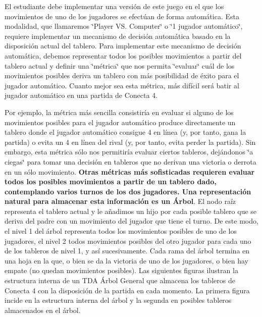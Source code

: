El estudiante debe implementar una versión de este juego en el que los movimientos de uno de los jugadores se efectúan de forma automática. Esta modalidad, que llamaremos \char`\"{}\+Player V\+S. Computer\char`\"{} o \char`\"{}1 jugador automático\char`\"{}, requiere implementar un mecanismo de decisión automática basado en la disposición actual del tablero. Para implementar este mecanismo de decisión automática, debemos representar todos los posibles movimientos a partir del tablero actual y definir una \char`\"{}métrica\char`\"{} que nos permita \char`\"{}evaluar\char`\"{} cuál de los movimientos posibles deriva un tablero con más posibilidad de éxito para el jugador automático. Cuanto mejor sea esta métrica, más difícil será batir al jugador automático en una partida de Conecta 4.

Por ejemplo, la métrica más sencilla consistiría en evaluar si alguno de los movimientos posibles para el jugador automático produce directamente un tablero donde el jugador automático consigue 4 en línea (y, por tanto, gana la partida) o evita un 4 en línea del rival (y, por tanto, evita perder la partida). Sin embargo, esta métrica sólo nos permitiría evaluar ciertos tableros, dejándonos \char`\"{}a ciegas\char`\"{} para tomar una decisión en tableros que no derivan una victoria o derrota en un sólo movimiento. {\bfseries Otras métricas más sofisticadas requieren evaluar todos los posibles movimientos a partir de un tablero dado, contemplando varios turnos de los dos jugadores. Una representación natural para almacenar esta información es un Árbol}. El nodo raíz representa el tablero actual y le añadimos un hijo por cada posible tablero que se deriva del padre con un movimiento del jugador que tiene el turno. De este modo, el nivel 1 del árbol representa todos los movimientos posibles de uno de los jugadores, el nivel 2 todos movimientos posibles del otro jugador para cada uno de los tableros de nivel 1, y así sucesivamente. Cada rama del árbol termina en una hoja en la que, o bien se da la victoria de uno de los jugadores, o bien hay empate (no quedan movimientos posibles). Las siguientes figuras ilustran la estructura interna de un T\+DA Árbol General que almacena los tableros de Conecta 4 con la disposición de la partida en cada momento. La primera figura incide en la estructura interna del árbol y la segunda en posibles tableros almacenados en el árbol.


